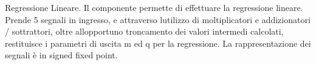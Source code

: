 Regressione Lineare. Il componente permette di effettuare la regressione lineare. Prende 5 segnali in ingresso, e attraverso l\textquotesingle{}utilizzo di moltiplicatori e addizionatori / sottrattori, oltre all\textquotesingle{}opportuno troncamento dei valori intermedi calcolati, restituisce i parametri di uscita m ed q per la regressione. La rappresentazione dei segnali è in signed fixed point. 